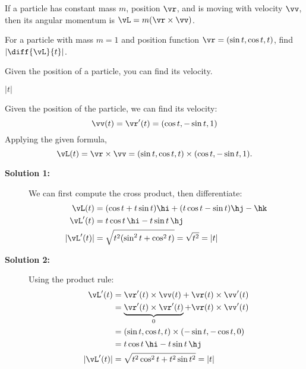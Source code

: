 \begin{question}
If a particle has constant mass $m$, position $\vr$, and is moving with velocity $\vv$, then its angular momentum is $\vL=m(\vr\times\vv)$. 

For a particle with mass $m=1$ and position function $\vr=(\sin t, \cos t, t)$, find $\left|\diff{\vL}{t} \right|$.

\end{question}
\begin{hint} 
Given the position of a particle, you can find its velocity.
\end{hint}
\begin{answer}
$|t|$
\end{answer}
\begin{solution}
Given the position of the particle, we can find its velocity:
\[\vv(t)=\vr'(t)=(\cos t, -\sin t , 1)\]
Applying the given formula,
\[\vL(t)=\vr \times \vv=(\sin t , \cos t , t) \times (\cos t, -\sin t , 1).\]
\begin{description}
\item[\textbf{Solution 1:}]
We can first compute the cross product, then differentiate:
\begin{align*}
\vL(t)& = (\cos t + t\sin t)\hi + (t\cos t - \sin t)\hj-\hk\\
\vL'(t)&=t\cos t\,\hi -t\sin t\, \hj\\
|\vL'(t)|&=\sqrt{t^2(\sin^2 t + \cos^2 t)}=\sqrt{t^2}=|t|
\end{align*}
\item[\textbf{Solution 2:}]
Using the product rule:
\begin{align*}
\vL'(t)&=\vr'(t)\times \vv(t) + \vr(t) \times \vv'(t)\\
&=\underbrace{\vr'(t)\times \vr'(t)}_{0} + \vr(t) \times \vv'(t)\\
&= (\sin t ,\cos t,t)\times(-\sin t , -\cos t, 0)\\
&=t\cos t\,\hi-t\sin t\,\hj\\
|\vL'(t)|&=\sqrt{t^2\cos^2 t + t^2\sin t^2  }=|t|
\end{align*}
\end{description}
\end{solution}



\subsection*{\Application}



